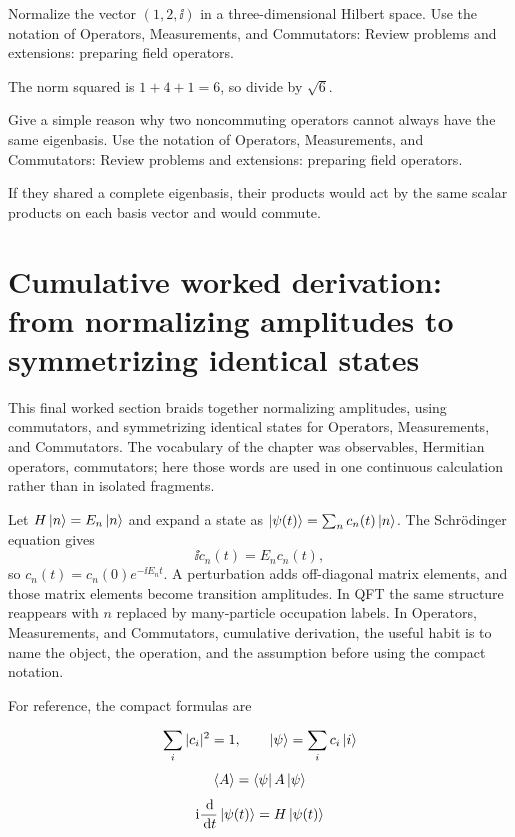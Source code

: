 \begin{exercise}
Normalize the vector \((1,2,\ii)\) in a three-dimensional Hilbert space.  Use the notation of Operators, Measurements, and Commutators: Review problems and extensions: preparing field operators.
\begin{answer}
The norm squared is \(1+4+1=6\), so divide by \(\sqrt6\).
\end{answer}
\end{exercise}

\begin{exercise}
Give a simple reason why two noncommuting operators cannot always have the same eigenbasis.  Use the notation of Operators, Measurements, and Commutators: Review problems and extensions: preparing field operators.
\begin{answer}
If they shared a complete eigenbasis, their products would act by the same scalar products on each basis vector and would commute.
\end{answer}
\end{exercise}



\section{Cumulative worked derivation: from normalizing amplitudes to symmetrizing identical states}

This final worked section braids together normalizing amplitudes, using commutators, and symmetrizing identical states for Operators, Measurements, and Commutators.  The vocabulary of the chapter was observables, Hermitian operators, commutators; here those words are used in one continuous calculation rather than in isolated fragments.

Let \(H\left|n\right\rangle=E_n\left|n\right\rangle\) and expand a state as \(\left|\psi(t)\right\rangle=\sum_nc_n(t)\left|n\right\rangle\).  The Schrödinger equation gives
\[
  \ii\dot c_n(t)=E_nc_n(t),
\]
so \(c_n(t)=c_n(0)e^{-\ii E_nt}\).  A perturbation adds off-diagonal matrix elements, and those matrix elements become transition amplitudes.  In QFT the same structure reappears with \(n\) replaced by many-particle occupation labels.  In Operators, Measurements, and Commutators, cumulative derivation, the useful habit is to name the object, the operation, and the assumption before using the compact notation.

For reference, the compact formulas are

\[
  \sum_i |c_i|^2=1,\qquad \left|\psi\right\rangle=\sum_i c_i\left|i\right\rangle
\]
\[
  \left\langle A\right\rangle=\left\langle \psi\right|A\left|\psi\right\rangle
\]
\[
  \mathrm i\frac{\,\mathrm d}{\,\mathrm d t}\left|\psi(t)\right\rangle=H\left|\psi(t)\right\rangle
\]

